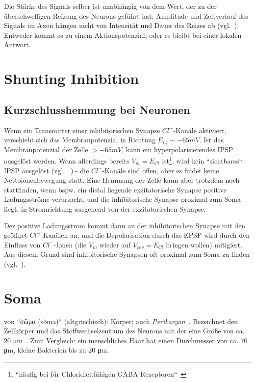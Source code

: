 {Die Stärke des Signals selber ist unabhängig von dem Wert, der zu der überschwelligen Reizung des Neurons geführt hat: Amplitude und Zeitverlauf des Signals im Axon hängen nicht von Intensität und Dauer des Reizes ab (vgl.~\cite[75]{Jon19}). Entweder kommt es zu einem Aktionspotenzial, oder es bleibt bei einer lokalen Antwort.

\section{Shunting Inhibition}\label{appendix:shuntinginhibition}
\subsection*{Kurzschlusshemmung bei Neuronen}
Wenn ein Transmitter einer inhibitorischen Synapse $Cl^-$-Kanäle aktiviert, verschiebt sich das Membranpotenzial in Richtung $E_{Cl} \sim -65 mV$.
Ist das Membranpotenzial der Zelle $> -65 mV$, kann ein hyperpolarisierendes IPSP ausgelöst werden.
Wenn allerdings bereits $V_m = E_{Cl}$ ist\footnote{
    ``häufig bei für Chloridleitfähigen GABA Rezeptoren``~\cite[100]{HS19a}
}, wird kein ``sichtbares`` IPSP ausgelöst (vgl. ~\cite[145 f.]{BCP18}) - die $Cl^-$-Kanäle sind offen, aber es findet keine Nettoionenbewegung statt.
Eine Hemmung der Zelle kann aber trotzdem noch stattfinden, wenn bspw. ein distal liegende exzitatorische Synapse positive Ladungsströme verursacht, und die inhibitorische Synapse proximal zum Soma liegt, in Stromrichtung ausgehend von der exzitatorischen Synapse.

Der positive Ladungsstrom kommt dann an der inhibitorischen Synapse mit den geöffnet $Cl^-$-Kanälen an, und die Depolarisation durch das EPSP wird durch den Einfluss von $Cl^-$-Ionen (die $V_m$ wieder auf $V_{rev} = E_{Cl}$ bringen wollen) mitigiert.\\

Aus diesem Grund sind inhibitorische Synapsen oft proximal zum Soma zu finden (vgl.~\cite[231]{KSJ+13}).


\section{Soma}\label{appendix:soma}
von ``\textgreek{σῶμα} (sõma)`` (altgriechisch): Körper; auch \textit{Perikaryon}~\cite[58]{RK18}.
Bezeichnet den Zellkörper und das Stoffwechselzentrum des Neurons mit der eine Größe von ca. $20$ μm~\cite[29]{BCP18}.
Zum Vergleich: ein menschliches Haar hat einen Durchmesser von ca. $70$ μm, kleine Bakterien bis zu $20$ μm.


}
